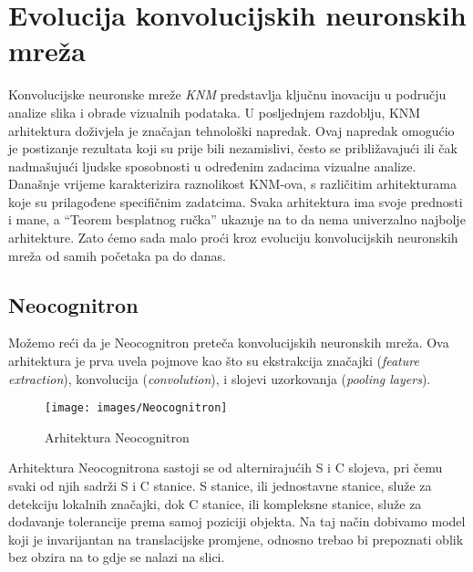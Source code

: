 
\chapter{Evolucija konvolucijskih neuronskih mreža}\label{ch:evolucija-konvolucijskih-neuronskih-mreza}
Konvolucijske neuronske mreže \emph{KNM} predstavlja ključnu inovaciju u području analize slika i obrade vizualnih podataka.
U posljednjem razdoblju, KNM arhitektura doživjela je značajan tehnološki napredak.
Ovaj napredak omogućio je postizanje rezultata koji su prije bili nezamislivi, često se približavajući ili čak nadmašujući ljudske sposobnosti u određenim zadacima vizualne analize.
Današnje vrijeme karakterizira raznolikost KNM-ova, s različitim arhitekturama koje su prilagođene specifičnim zadatcima.
Svaka arhitektura ima svoje prednosti i mane, a \enquote{Teorem besplatnog ručka} ukazuje na to da nema univerzalno najbolje arhitekture.
Zato ćemo sada malo proći kroz evoluciju konvolucijskih neuronskih mreža od samih početaka pa do danas.

\section{Neocognitron}\label{sec:neocognitron}
Možemo reći da je Neocognitron preteča konvolucijskih neuronskih mreža.
Ova arhitektura je prva uvela pojmove kao što su ekstrakcija značajki (\emph{feature extraction}), konvolucija (\emph{convolution}), i slojevi uzorkovanja (\emph{pooling layers}).
\FloatBarrier
\begin{figure}[h]
    \centering
    \texttt{[image: images/Neocognitron]}
    \caption{Arhitektura Neocognitron}
    \label{fig:slika7}
\end{figure}
\FloatBarrier
Arhitektura Neocognitrona sastoji se od alternirajućih S i C slojeva, pri čemu svaki od njih sadrži S i C stanice.
S stanice, ili jednostavne stanice, služe za detekciju lokalnih značajki, dok C stanice, ili kompleksne stanice, služe za dodavanje tolerancije prema samoj poziciji objekta.
Na taj način dobivamo model koji je invarijantan na translacijske promjene, odnosno trebao bi prepoznati oblik bez obzira na to gdje se nalazi na slici.

